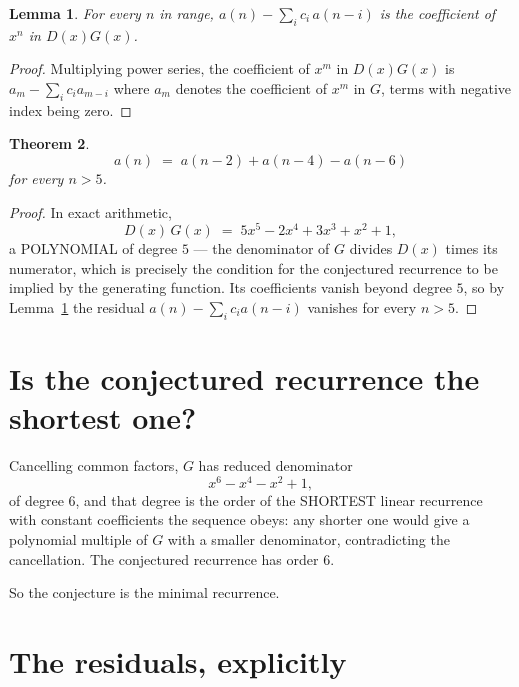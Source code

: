 \documentclass[11pt,a4paper]{article}
\theoremstyle{plain}
\newtheorem{theorem}{Theorem}
\newtheorem{lemma}[theorem]{Lemma}
\theoremstyle{definition}
\begin{document}
\begin{lemma}\label{lem:key}
For every $n$ in range, $a(n)-\sum_i c_i\,a(n-i)$ is the coefficient of $x^{n}$ in
$D(x)G(x)$.
\end{lemma}

\begin{proof}
Multiplying power series, the coefficient of $x^{m}$ in $D(x)G(x)$ is
$a_m-\sum_i c_i a_{m-i}$ where $a_m$ denotes the coefficient of $x^{m}$ in $G$, terms with
negative index being zero.
\end{proof}

\begin{theorem}
\[
a(n)\;=\;a(n-2) + a(n-4) - a(n-6)
\]
for every $n>5$.
\end{theorem}

\begin{proof}
In exact arithmetic,
\[
D(x)\,G(x)\;=\;5 x^{5} - 2 x^{4} + 3 x^{3} + x^{2} + 1,
\]
a POLYNOMIAL of degree $5$ --- the denominator of $G$ divides $D(x)$ times its numerator,
which is precisely the condition for the conjectured recurrence to be implied by the
generating function. Its coefficients vanish beyond degree $5$, so by
Lemma~\ref{lem:key} the residual $a(n)-\sum_ic_ia(n-i)$ vanishes for every
$n>5$.
\end{proof}

\section{Is the conjectured recurrence the shortest one?}

Cancelling common factors, $G$ has reduced denominator
\[
x^{6} - x^{4} - x^{2} + 1,
\]
of degree $6$, and that degree is the order of the SHORTEST linear recurrence with
constant coefficients the sequence obeys: any shorter one would give a polynomial multiple of
$G$ with a smaller denominator, contradicting the cancellation. The conjectured recurrence has
order $6$.

So the conjecture is the minimal recurrence.

\section{The residuals, explicitly}
\end{document}
